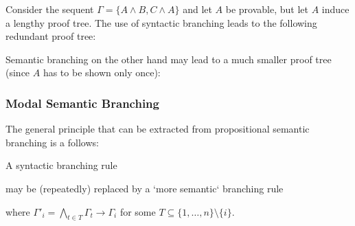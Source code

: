 \documentclass{llncs}
\begin{document}
\begin{example}
Consider the sequent $\Gamma=\{A\wedge B, C\wedge A\}$ and let $A$ be provable,
but let $A$ induce a lengthy proof tree. The use of 
syntactic branching leads to the following redundant proof tree:
\begin{quote}
\centerline{
}
\end{quote}
Semantic branching on the other hand may lead to a much smaller proof tree (since $A$ has
to be shown only once):
\begin{quote}
\centerline{
}
\end{quote}

\end{example}

\subsubsection{Modal Semantic Branching}

The general principle that can be extracted from propositional semantic branching
is a follows:

A syntactic branching rule
\begin{quote}
\centerline{}
\end{quote}
may be (repeatedly) replaced by a `more semantic` branching rule
\begin{quote}
\centerline{}
\end{quote}
where $\Gamma'_i=\bigwedge_{t\in T}\Gamma_t\rightarrow\Gamma_i$ for some
$T\subseteq\{1,\ldots,n\}\setminus\{i\}$.
\end{document}
